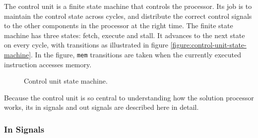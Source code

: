 The control unit is a finite state machine that controls the processor.
Its job is to maintain the control state across cycles, and distribute the correct control signals to the other components in the processor at the right time.
The finite state machine has three states: fetch, execute and stall.
It advances to the next state on every cycle, with transitions as illustrated in figure \vref{figure:control-unit-state-machine}.
In the figure, \texttt{mem} transitions are taken when the currently executed instruction accesses memory.

\begin{figure}[h]
    \begin{center}
            \caption{Control unit state machine.}
            \label{figure:control-unit-state-machine}
    \end{center}
\end{figure}

Because the control unit is so central to understanding how the solution processor works, its in signals and out signals are described here in detail.

\subsubsection{In Signals}

